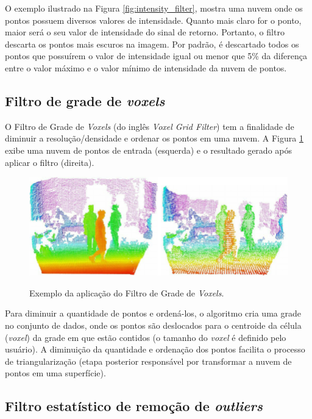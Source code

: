 O exemplo ilustrado na Figura \ref{fig:intensity_filter}, mostra uma nuvem onde os pontos possuem diversos valores de intensidade. 
Quanto mais claro for o ponto, maior será o seu valor de intensidade do sinal de retorno. 
Portanto, o filtro descarta os pontos mais escuros na imagem.
Por padrão, é descartado todos os pontos que possuírem o valor de intensidade igual ou menor que 5\% da diferença entre o valor máximo e o valor mínimo de intensidade da nuvem de pontos.

\subsection{Filtro de grade de \textit{voxels}}
\label{sec:voxelgrid_filter}

O Filtro de Grade de \textit{Voxels} (do inglês \textit{Voxel Grid Filter}) tem a finalidade de diminuir a resolução/densidade e ordenar os pontos em uma nuvem. 
A Figura \ref{fig:voxelgrid_filter} exibe uma nuvem de pontos de entrada (esquerda) e o resultado gerado após aplicar o filtro (direita).

\begin{figure}[H]
    \centering
    \caption{Exemplo da aplicação do Filtro de Grade de \textit{Voxels}.}
    \includegraphics[scale=0.4]{dados/figuras/voxelgrid_filter.png}
    \label{fig:voxelgrid_filter}
\end{figure}

Para diminuir a quantidade de pontos e ordená-los, o algoritmo cria uma grade no conjunto de dados, onde os pontos são deslocados para o centroide da célula (\textit{voxel}) da grade em que estão contidos (o tamanho do \textit{voxel} é definido pelo usuário). A diminuição da quantidade e ordenação dos pontos facilita o processo de triangularização (etapa posterior responsável por transformar a nuvem de pontos em uma superfície).

\subsection{Filtro estatístico de remoção de \textit{outliers}}
\label{sec:statistical_outlier_removal}

